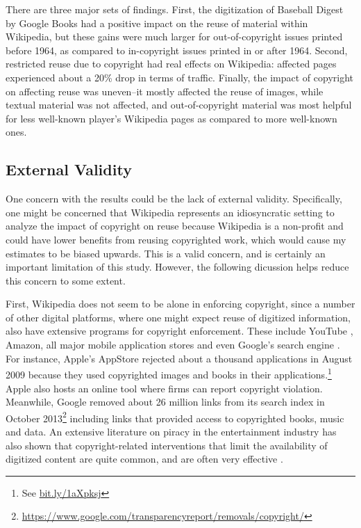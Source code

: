\documentclass[11pt]{article}
\begin{document}
There are three major sets of findings. First, the digitization of Baseball Digest by Google Books had a positive impact on the reuse of material within Wikipedia, but these gains were much larger for out-of-copyright issues printed before 1964, as compared to in-copyright issues printed in or after 1964. Second, restricted reuse due to copyright had real effects on Wikipedia: affected pages experienced about a 20\% drop in terms of traffic. Finally, the impact of copyright on affecting reuse was uneven--it mostly affected the reuse of images, while textual material was not affected, and out-of-copyright material was most helpful for less well-known player's Wikipedia pages as compared to more well-known ones. 

\subsection{External Validity}

One concern with the results could be the lack of external validity. Specifically, one might be concerned that Wikipedia represents an idiosyncratic setting to analyze the impact of copyright on reuse because Wikipedia is a non-profit and could have lower benefits from reusing copyrighted work, which would cause my estimates to be biased upwards. This is a valid concern, and is certainly an important limitation of this study. However, the following dicussion helps reduce this concern to some extent. 

First, Wikipedia does not seem to be alone in enforcing copyright, since a number of other digital platforms, where one might expect reuse of digitized information, also have extensive programs for copyright enforcement. These include YouTube \citep{seidenberg_copyright_2009}, Amazon, all major mobile application stores and even Google's search engine \citep{dillon_scott_google_2011}. For instance, Apple's AppStore rejected about a thousand applications in August 2009 because they used copyrighted images and books in their applications.\footnote{See \url{bit.ly/1aXpksj}} Apple also hosts an online tool where firms can report copyright violation. Meanwhile, Google removed about 26 million links from its search index in October 2013\footnote{\url{https://www.google.com/transparencyreport/removals/copyright/}} including links that provided access to copyrighted books, music and data. An extensive literature on piracy \citep{bechtold_digital_2004} in the entertainment industry has also shown that copyright-related interventions that limit the availability of digitized content are quite common, and are often very effective \citep{danaher_converting_2010, danaher_gone_2013}. 
\end{document}
